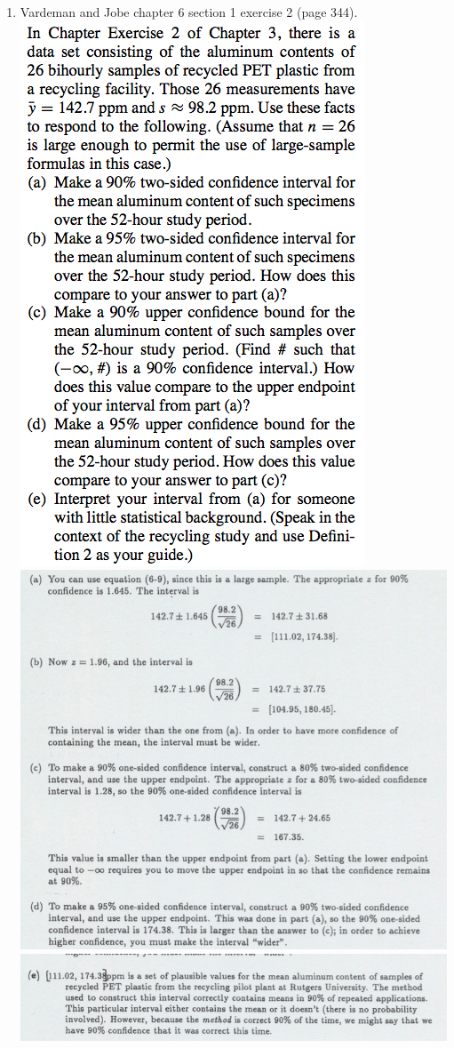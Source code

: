 \documentclass{article}\usepackage{graphicx, color}
\numberwithin{equation}{section}
\begin{document}
\begin{flushleft}
\begin{enumerate}[1. ]
\item Vardeman and Jobe chapter 6 section 1 exercise 2 (page 344).
 \includegraphics{../../fig/h8p2.png}
 \includegraphics{../../fig/h8p2sol1.png}
 \includegraphics{../../fig/h8p2sol2.png}


\end{enumerate}
\end{flushleft}
\end{document}
